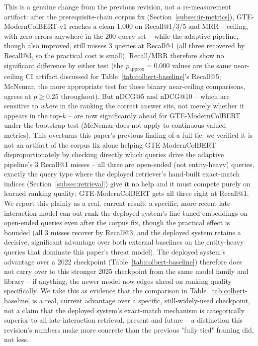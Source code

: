\documentclass[a4paper,twoside]{article}
\begin{document}
This is a genuine change from the previous revision, not a re-measurement artifact: after the prerequisite-chain corpus fix (Section~\ref{subsec:ir-metrics}), GTE-ModernColBERT-v1 reaches a clean 1.000 on Recall@1/3/5 and MRR -- ceiling, with zero errors anywhere in the 200-query set -- while the adaptive pipeline, though also improved, still misses 3 queries at Recall@1 (all three recovered by Recall@3, so the practical cost is small). Recall/MRR therefore show no significant difference by either test (the $p_{\text{approx}}=0.000$ values are the same near-ceiling CI artifact discussed for Table~\ref{tab:colbert-baseline}'s Recall@5; McNemar, the more appropriate test for these binary near-ceiling comparisons, agrees at $p\geq0.25$ throughout). But nDCG@5 and nDCG@10 -- which are sensitive to \emph{where} in the ranking the correct answer sits, not merely whether it appears in the top-$k$ -- are now significantly ahead for GTE-ModernColBERT under the bootstrap test (McNemar does not apply to continuous-valued metrics). This overturns this paper's previous finding of a full tie: we verified it is not an artifact of the corpus fix alone helping GTE-ModernColBERT disproportionately by checking directly which queries drive the adaptive pipeline's 3 Recall@1 misses -- all three are open-ended (not entity-heavy) queries, exactly the query type where the deployed retriever's hand-built exact-match indices (Section~\ref{subsec:retrieval}) give it no help and it must compete purely on learned ranking quality; GTE-ModernColBERT gets all three right at Recall@1. We report this plainly as a real, current result: a specific, more recent late-interaction model can out-rank the deployed system's fine-tuned embeddings on open-ended queries even after the corpus fix, though the practical effect is bounded (all 3 misses recover by Recall@3, and the deployed system retains a decisive, significant advantage over both external baselines on the entity-heavy queries that dominate this paper's threat model). The deployed system's advantage over a 2022 checkpoint (Table~\ref{tab:colbert-baseline}) therefore does not carry over to this stronger 2025 checkpoint from the same model family and library -- if anything, the newer model now edges ahead on ranking quality specifically. We take this as evidence that the comparison in Table~\ref{tab:colbert-baseline} is a real, current advantage over a specific, still-widely-used checkpoint, not a claim that the deployed system's exact-match mechanism is categorically superior to all late-interaction retrieval, present and future -- a distinction this revision's numbers make more concrete than the previous "fully tied" framing did, not less.
\end{document}
